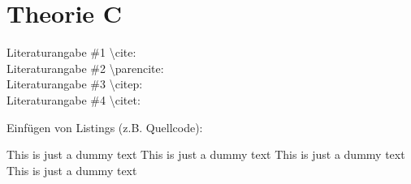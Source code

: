 \section{Theorie C}
\label{sec:theorieC}

Literaturangabe \#1 \textbackslash cite: \cite{max2007company} \\
Literaturangabe \#2 \textbackslash parencite: \parencite{example2017sdk} \\
Literaturangabe \#3 \textbackslash citep: \citep{place2014art} \\
Literaturangabe \#4 \textbackslash citet: \citet{max2007company}

\bigskip

Einfügen von Listings (z.B. Quellcode):

\begin{center}
	\begin{minipage}[!H]{\textwidth}
		
	\end{minipage}
\end{center}
\bigskip

This is just a dummy text This is just a dummy text  This is just a dummy text This is just a dummy text 